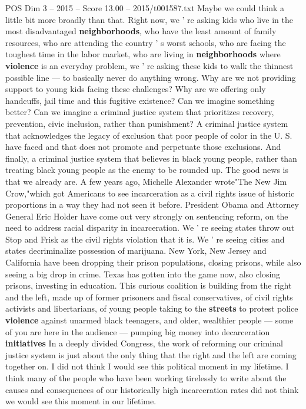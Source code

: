 \begin{textsample}{POS Dim 3 – 2015 – Score 13.00 – 2015/t001587.txt}
Maybe we could think a little bit more broadly than that.
Right now, we ' re asking kids who live in the most disadvantaged \textbf{neighborhoods}, who have the least amount of family resources, who are attending the country ' s worst schools, who are facing the toughest time in the labor market, who are living in \textbf{neighborhoods} where \textbf{violence} is an everyday problem, we ' re asking these kids to walk the thinnest possible line — to basically never do anything wrong.
Why are we not providing support to young kids facing these challenges?
Why are we offering only handcuffs, jail time and this fugitive existence?
Can we imagine something better?
Can we imagine a criminal justice system that prioritizes recovery, prevention, civic inclusion, rather than punishment?
A criminal justice system that acknowledges the legacy of exclusion that poor people of color in the U.
S. have faced and that does not promote and perpetuate those exclusions.
And finally, a criminal justice system that believes in black young people, rather than treating black young people as the enemy to be rounded up.
The good news is that we already are.
A few years ago, Michelle Alexander wrote"The New Jim Crow,"which got Americans to see incarceration as a civil rights issue of historic proportions in a way they had not seen it before.
President Obama and Attorney General Eric Holder have come out very strongly on sentencing reform, on the need to address racial disparity in incarceration.
We ' re seeing states throw out Stop and Frisk as the civil rights violation that it is.
We ' re seeing cities and states decriminalize possession of marijuana.
New York, New Jersey and California have been dropping their prison populations, closing prisons, while also seeing a big drop in crime.
Texas has gotten into the game now, also closing prisons, investing in education.
This curious coalition is building from the right and the left, made up of former prisoners and fiscal conservatives, of civil rights activists and libertarians, of young people taking to the \textbf{streets} to protest police \textbf{violence} against unarmed black teenagers, and older, wealthier people — some of you are here in the audience — pumping big money into decarceration \textbf{initiatives} In a deeply divided Congress, the work of reforming our criminal justice system is just about the only thing that the right and the left are coming together on.
I did not think I would see this political moment in my lifetime.
I think many of the people who have been working tirelessly to write about the causes and consequences of our historically high incarceration rates did not think we would see this moment in our lifetime.

\end{textsample}
